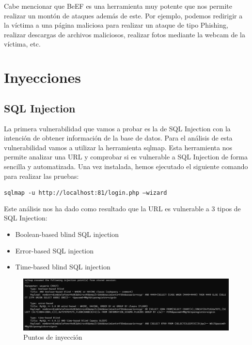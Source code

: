 \documentclass{report}
\begin{document}
                Cabe mencionar que BeEF es una herramienta muy potente que nos permite realizar un montón de ataques además de este.
                Por ejemplo, podemos redirigir a la víctima a una página maliciosa para realizar un ataque de tipo Phishing,
                realizar descargas de archivos maliciosos,
                realizar fotos mediante la webcam de la víctima,
                etc.
                \clearpage
        \section{Inyecciones}
            \subsection{SQL Injection}
                La primera vulnerabilidad que vamos a probar es la de SQL Injection con la intención de obtener información de la base de datos.
                Para el análisis de esta vulnerabilidad vamos a utilizar la herramienta sqlmap. 
                Esta herramienta nos permite analizar una URL y comprobar si es vulnerable a SQL Injection de forma sencilla y automatizada.
                Una vez instalada, hemos ejecutado el siguiente comando para realizar las pruebas:\\
                \begin{center}
                    \texttt{sqlmap -u http://localhost:81/login.php --wizard}
                \end{center}
                Este análisis nos ha dado como resultado que la URL es vulnerable a 3 tipos de SQL Injection:
                \begin{itemize}
                    \item Boolean-based blind SQL injection
                    \item Error-based SQL injection
                    \item Time-based blind SQL injection
                \end{itemize}
                \begin{figure}[H]
                    \centering
                    \includegraphics[width=1\textwidth]{./img/vulnerabilidades/2.3/1.1.png}
                    \caption{Puntos de inyección}
                \end{figure}
\end{document}
